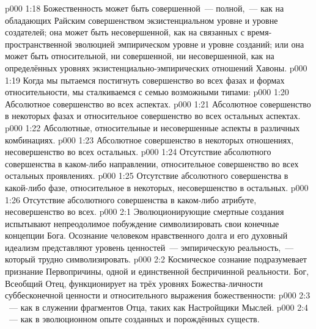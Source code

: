 \vs p000 1:18 Божественность может быть совершенной~--- полной,~--- как на обладающих Райским совершенством экзистенциальном уровне и уровне создателей; она может быть несовершенной, как на связанных с время\hyp{}пространственной эволюцией эмпирическом уровне и уровне созданий; или она может быть относительной, ни совершенной, ни несовершенной, как на определённых уровнях экзистенциально\hyp{}эмпирических отношений Хавоны.
\vs p000 1:19 \pc Когда мы пытаемся постигнуть совершенство во всех фазах и формах относительности, мы сталкиваемся с семью возможными типами:
\vs p000 1:20 Абсолютное совершенство во всех аспектах.
\vs p000 1:21 Абсолютное совершенство в некоторых фазах и относительное совершенство во всех остальных аспектах.
\vs p000 1:22 Абсолютные, относительные и несовершенные аспекты в различных комбинациях.
\vs p000 1:23 Абсолютное совершенство в некоторых отношениях, несовершенство во всех остальных.
\vs p000 1:24 Отсутствие абсолютного совершенства в каком\hyp{}либо направлении, относительное совершенство во всех остальных проявлениях.
\vs p000 1:25 Отсутствие абсолютного совершенства в какой\hyp{}либо фазе, относительное в некоторых, несовершенство в остальных.
\vs p000 1:26 Отсутствие абсолютного совершенства в каком\hyp{}либо атрибуте, несовершенство во всех.
\vs p000 2:1 Эволюционирующие смертные создания испытывают непреодолимое побуждение символизировать свои конечные концепции Бога. Осознание человеком нравственного долга и его духовный идеализм представляют уровень ценностей~--- эмпирическую реальность,~--- который трудно символизировать.
\vs p000 2:2 Космическое сознание подразумевает признание Первопричины, одной и единственной беспричинной реальности. Бог, Всеобщий Отец, функционирует на трёх уровнях Божества\hyp{}личности суббесконечной ценности и относительного выражения божественности:
\vs p000 2:3 ~--- как в служении фрагментов Отца, таких как Настройщики Мыслей.
\vs p000 2:4 ~--- как в эволюционном опыте созданных и порождённых существ.

